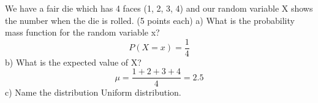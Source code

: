 \documentclass{homeworg}
\begin{document}
\exercise
We have a fair die which has 4 faces (1, 2, 3, 4) and our random variable X
shows the number when the die is rolled. (5 points each)
\newline
a) What is the probability mass function for the random variable x?
\newline
$$
P(X=x)=\frac{1}{4}
$$
b) What is the expected value of X?
\newline
$$
\mu = \frac{1+2+3+4}{4}=2.5
$$
\newline
c) Name the distribution
\newline
Uniform distribution. 


\end{document}
